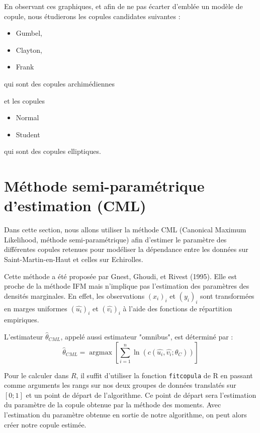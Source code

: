 En observant ces graphiques, et afin de ne pas écarter d'emblée un modèle de copule, nous étudierons les copules candidates suivantes :
\begin{itemize}
\item Gumbel,
\item Clayton,
\item Frank 
\end{itemize}
qui sont des copules archimédiennes 

et les copules
\begin{itemize} 
\item Normal
\item Student
\end{itemize}
qui sont des copules elliptiques.





\section{Méthode semi-paramétrique d'estimation (CML)}

Dans cette section, nous allons utiliser la méthode CML (Canonical Maximum Likelihood, méthode semi-paramétrique) afin d'estimer le paramètre des différentes copules retenues pour modéliser la dépendance entre les données sur Saint-Martin-en-Haut et celles sur Echirolles.

Cette méthode a été proposée par Gnest, Ghoudi, et Rivest (1995). Elle est proche de la méthode IFM mais n'implique pas l'estimation des paramètres
des densités marginales. En effet, les observations $(x_i)_i$ et $(y_i)_i$ sont transformées en marges uniformes $(\widehat{u_i})_i$ et $(\widehat{v_i})_i$ à l'aide
des fonctions de répartition empiriques.

L'estimateur $\widehat{\theta}_{CML}$, appelé aussi estimateur "omnibus", est déterminé par :
$$
\widehat{\theta}_{CML} = \operatorname{argmax} \left[ \sum_{i=1}^n \operatorname{ln} \left(c(\widehat{u_i},\widehat{v_i};\theta_C) \right)  \right]
$$ 


Pour le calculer dans $R$, il suffit d'utiliser la fonction \lstinline!fitcopula! de R en passant comme arguments les rangs sur nos deux groupes de données translatés sur $[0;1]$ et un point de départ de l'algorithme. Ce point de départ sera l'estimation du paramètre de la copule obtenue par la méthode des moments. Avec l'estimation du paramètre obtenue en sortie de notre algorithme, on peut alors créer notre copule estimée.

